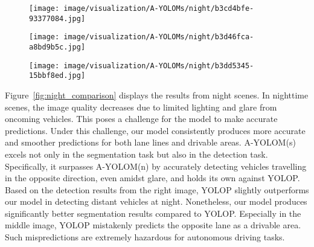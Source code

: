 \documentclass[lettersize,journal]{IEEEtran}
\begin{document}
{\begin{figure*}[!h]
    \begin{subfigure}[b]{0.05\textwidth}
        \centering
        \vspace{0.1cm}
    \end{subfigure}\begin{subfigure}{0.25\textwidth}
        \centering
        \texttt{[image: image/visualization/A-YOLOMs/night/b3cd4bfe-93377084.jpg]}
    \end{subfigure}\hspace{0.5cm}
    \begin{subfigure}{0.25\textwidth}
        \centering
        \texttt{[image: image/visualization/A-YOLOMs/night/b3d46fca-a8bd9b5c.jpg]}
    \end{subfigure}\hspace{0.5cm}
    \begin{subfigure}{0.25\textwidth}
        \centering
        \texttt{[image: image/visualization/A-YOLOMs/night/b3dd5345-15bbf8ed.jpg]}
    \end{subfigure}
    \caption{Visual Comparison of Results at Night}
    \label{fig:night_comparison}
\end{figure*}

Figure~\ref{fig:night_comparison} displays the results from night scenes. In nighttime scenes, the image quality decreases due to limited lighting and glare from oncoming vehicles. This poses a challenge for the model to make accurate predictions. Under this challenge, our model consistently produces more accurate and smoother predictions for both lane lines and drivable areas. A-YOLOM(s) excels not only in the segmentation task but also in the detection task. Specifically, it surpasses A-YOLOM(n) by accurately detecting vehicles travelling in the opposite direction, even amidst glare, and holds its own against YOLOP. Based on the detection results from the right image, YOLOP slightly outperforms our model in detecting distant vehicles at night. Nonetheless, our model produces significantly better segmentation results compared to YOLOP. Especially in the middle image, YOLOP mistakenly predicts the opposite lane as a drivable area. Such mispredictions are extremely hazardous for autonomous driving tasks. 

\begin{figure*}[!h]
    \centering
    

\end{figure*}}
\end{document}
